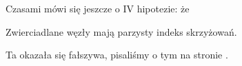 Czasami mówi się jeszcze o IV hipotezie: że
\begin{conjecture}
    Zwierciadlane węzły mają parzysty indeks skrzyżowań.
%
\end{conjecture}

Ta okazała się fałszywa, pisaliśmy o tym na stronie \pageref{con:tait_fourth}.

%


